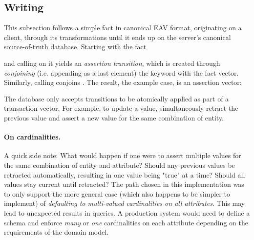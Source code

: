 \subsection{Writing}

This subsection follows a simple fact in canonical EAV format, originating on a client, through its transformations until it ends up on the server's canonical source-of-truth database. Starting with the fact

\begin{center}
\end{center}

and calling  on it yields an \emph{assertion transition}, which is created through \emph{conjoining} (i.e. appending as a last element) the \lisp{:+} keyword with the fact vector. Similarly, calling  conjoins \lisp{:-}. The result, the example case, is an assertion vector:

\begin{center}
\end{center}

The database only accepts transitions to be atomically applied as part of a transaction vector. For example, to update a value, simultaneously retract the previous value and assert a new value for the same combination of entity.

\begin{center}
\end{center}

\paragraph{On cardinalities.} A quick side note: What would happen if one were to assert multiple values for the same combination of entity and attribute? Should any previous values be retracted automatically, resulting in one value being "true" at a time? Should all values stay current until retracted? The path chosen in this implementation was to only support the more general case (which also happens to be simpler to implement) of \emph{defaulting to multi-valued cardinalities on all attributes}. This may lead to unexpected results in queries. A production system would need to define a schema and enforce \emph{many} or \emph{one} cardinalities on each attribute depending on the requirements of the domain model.

